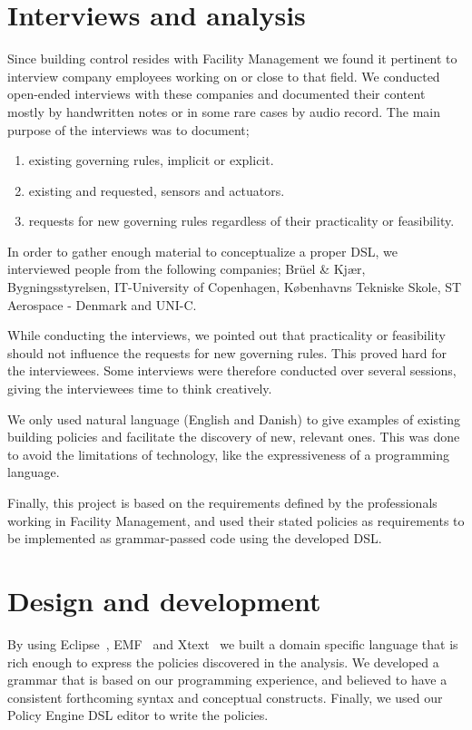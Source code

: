 \documentclass{llncs}
\begin{document}
\section{Interviews and analysis}\label{sec:interviews}
Since building control resides with Facility Management we found it pertinent to interview company employees working on or close to that field. We conducted open-ended interviews with these companies and documented their content mostly by handwritten notes or in some rare cases by audio record. The main purpose of the interviews was to document;

\begin{enumerate}
	\item existing governing rules, implicit or explicit.
	\item existing and requested, sensors and actuators.
	\item requests for new governing rules regardless of their practicality or feasibility.
\end{enumerate}

In order to gather enough material to conceptualize a proper DSL, we interviewed people from the following companies; Br\"{u}el \& Kj\ae r, Bygningsstyrelsen, IT-University of Copenhagen, K\o benhavns Tekniske Skole, ST Aerospace - Denmark and UNI-C.

While conducting the interviews, we pointed out that practicality or feasibility should not influence the requests for new governing rules. This proved hard for the interviewees. Some interviews were therefore conducted over several sessions, giving the interviewees time to think creatively. 

We only used natural language (English and Danish) to give examples of existing building policies and facilitate the discovery of new, relevant ones. This was done to avoid the limitations of technology, like the expressiveness of a programming language.

Finally, this project is based on the requirements defined by the professionals working in Facility Management, and used their stated policies as requirements to be implemented as grammar-passed code using the developed DSL.

\section{Design and development}\label{sec:dsldesign} 
By using Eclipse~\cite{eclipse}, EMF~\cite{emf} and Xtext~\cite{xtext} we built a domain specific language that is rich enough to express the policies discovered in the analysis. We developed a grammar that is based on our programming experience, and believed to have a consistent forthcoming syntax and conceptual constructs. Finally, we used our Policy Engine DSL editor to write the policies.
\end{document}
